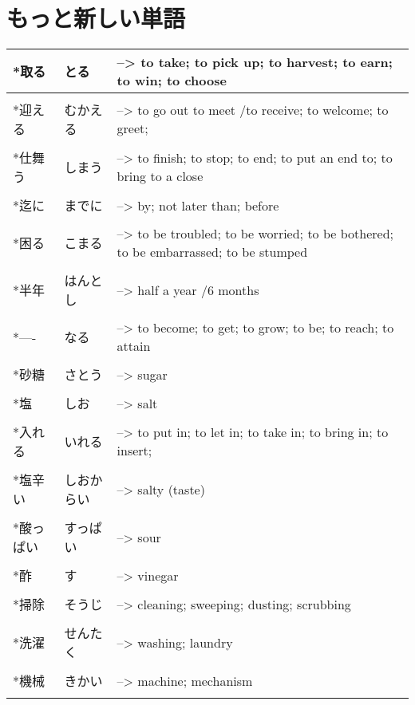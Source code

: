 \documentclass{article}
\begin{document}
\part*{もっと新しい単語}
\begin{tabular}{ l | l p{13cm} }
*取る&とる&--> to take; to pick up; to harvest; to earn; to win; to choose \\ \hline\\[-1em]
*迎える&むかえる&--> to go out to meet /to receive; to welcome; to greet; \\ \hline\\[-1em]
*仕舞う&しまう&--> to finish; to stop; to end; to put an end to; to bring to a close \\ \hline\\[-1em]
*迄に&までに&--> by; not later than; before \\ \hline\\[-1em]
*困る&こまる&--> to be troubled; to be worried; to be bothered; to be embarrassed; to be stumped \\ \hline\\[-1em]
*半年&はんとし&--> half a year /6 months \\ \hline\\[-1em]
*----&なる&--> to become; to get; to grow; to be; to reach; to attain \\ \hline\\[-1em]
*砂糖&さとう&--> sugar \\ \hline\\[-1em]
*塩&しお&--> salt \\ \hline\\[-1em]
*入れる&いれる&--> to put in; to let in; to take in; to bring in; to insert; \\ \hline\\[-1em]
*塩辛い&しおからい&--> salty (taste) \\ \hline\\[-1em]
*酸っぱい&すっぱい&--> sour \\ \hline\\[-1em]
*酢&す&--> vinegar \\ \hline\\[-1em]
*掃除&そうじ&--> cleaning; sweeping; dusting; scrubbing \\ \hline\\[-1em]
*洗濯&せんたく&--> washing; laundry \\ \hline\\[-1em]
*機械&きかい&--> machine; mechanism \\ \hline\\[-1em]

\end{tabular}
\end{document}
